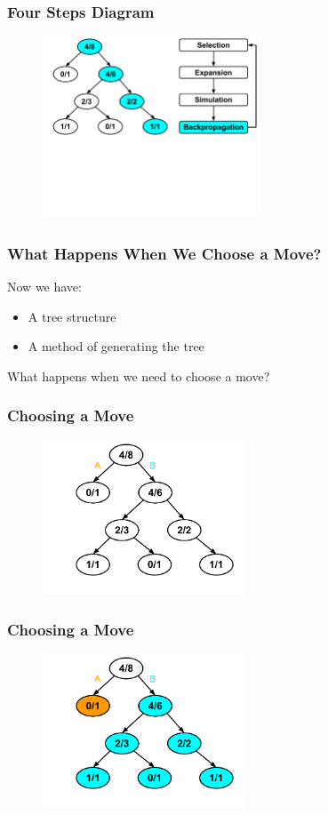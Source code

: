 \documentclass{beamer}
\begin{document}
\begin{frame}[fragile]
\frametitle{Four Steps Diagram}
\begin{figure}[h]
	\includegraphics[width=6.5cm]{Diagrams/MCTSShort/MCTSShortTwoFourFour.pdf}
	\centering
\end{figure}
\end{frame}


\begin{frame}
\frametitle{What Happens When We Choose a Move?}
Now we have:
\begin{itemize}
	\item{A tree structure}
	\item{A method of generating the tree}
\end{itemize}
What happens when we need to choose a move?
\end{frame}


\begin{frame}[fragile]
\frametitle{Choosing a Move}
\begin{figure}[h]
	\includegraphics[width=6cm]{Diagrams/MakeAMove/MakeAMoveOne.pdf}
	\centering
\end{figure}
\end{frame}

\begin{frame}[fragile]
\frametitle{Choosing a Move}
\begin{figure}[h]
	\includegraphics[width=6cm]{Diagrams/MakeAMove/MakeAMoveSubTrees.pdf}
	\centering
\end{figure}
\end{frame}
\end{document}
